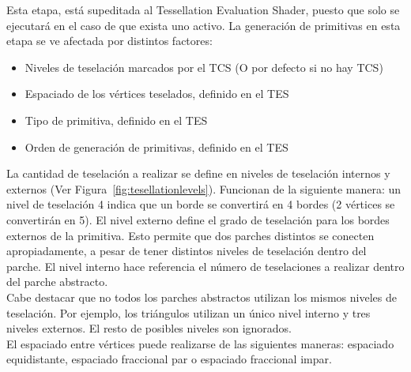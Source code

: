 Esta etapa, está supeditada al Tessellation Evaluation Shader, puesto que solo
se ejecutará en el caso de que exista uno activo. La generación de primitivas en
esta etapa se ve afectada por distintos factores:

\begin{itemize}
		\item Niveles de teselación marcados por el TCS (O por defecto si no hay
				TCS)
		\item Espaciado de los vértices teselados, definido en el TES
		\item Tipo de primitiva, definido en el TES
		\item Orden de generación de primitivas, definido en el TES
\end{itemize}

La cantidad de teselación a realizar se define en niveles de teselación internos
y externos (Ver Figura~\ref{fig:tesellationlevels}). Funcionan de la siguiente
manera: un nivel de teselación 4 indica que un borde se convertirá en 4 bordes
(2 vértices se convertirán en 5). El nivel externo define el grado de teselación
para los bordes externos de la primitiva. Esto permite que dos parches distintos
se conecten apropiadamente, a pesar de tener distintos niveles de teselación
dentro del parche. El nivel interno hace referencia el número de teselaciones a
realizar dentro del parche abstracto. \\

Cabe destacar que no todos los parches abstractos utilizan los mismos niveles de
teselación. Por ejemplo, los triángulos utilizan un único nivel interno y tres
niveles externos. El resto de posibles niveles son ignorados. \\

El espaciado entre vértices puede realizarse de las siguientes maneras:
espaciado equidistante, espaciado fraccional par o espaciado fraccional impar.

